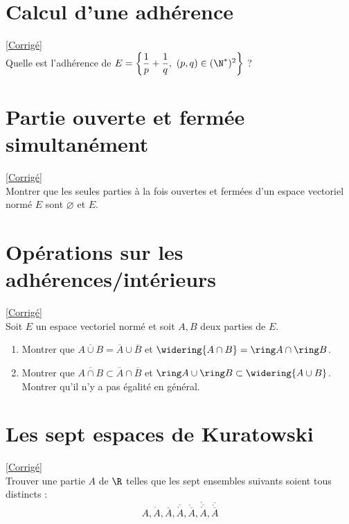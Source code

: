 \documentclass{book}
\begin{document}
\section{Calcul d'une adhérence }
\label{Calcul d'adhérence}
\textcolor{blue}{\hyperref[Calcul d'adhérence corrigé]{[Corrigé]}}\\
Quelle est l'adhérence de $E=\left\{\dfrac{1}{p}+\dfrac{1}{q},\ (p,q)\in (\N^*)^2\right\}$ ?

\section{Partie ouverte et fermée simultanément }
\label{Partie ouverte et fermée simultanément}
\textcolor{blue}{\hyperref[sec:partie-ouverte-et-fermee-simultanement]{[Corrigé]}}\\
Montrer que les seules parties à la fois ouvertes et fermées d'un espace vectoriel normé $E$ sont $\varnothing$ et $E$.

\section{Opérations sur les adhérences/intérieurs}
\label{Opérations sur les adhérences/intérieurs}
\textcolor{blue}{\hyperref[Opérations sur les adhérences/intérieurs corrigé]{[Corrigé]}}\\
Soit $E$ un espace vectoriel normé et soit $A,B$ deux parties de $E$.
\begin{enumerate}
	\item Montrer que $\overline{A\cup B}=\overline A\cup \overline B$ et $\widering{A\cap B}=\ring A\cap\ring B$.
	\item Montrer que $\overline{A\cap B}\subset \overline A\cap\overline B$ et $\ring A\cup\ring B\subset \widering{A\cup B}$.\\
	Montrer qu'il n'y a pas égalité en général.
\end{enumerate}

\section{Les sept espaces de Kuratowski }
\label{Les sept espaces de Kuratowski}
\textcolor{blue}{\hyperref[sec:les-sept-espaces-de-kuratowski]{[Corrigé]}}\\
Trouver une partie $A$ de $\R$ telles que les sept ensembles suivants soient tous distincts :
$$A,\ring A,\overline A,\overline{\ring A},\ring{\overline A},\ring{\overline{\ring A}},\overline{\ring{\overline A}}$$
\end{document}
